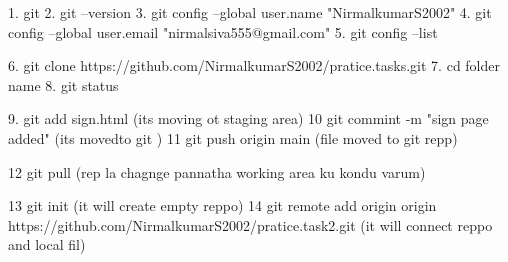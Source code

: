 1. git
2. git --version
3. git config --global user.name "NirmalkumarS2002"
4. git config --global user.email "nirmalsiva555@gmail.com"
5. git config --list 

6. git clone https://github.com/NirmalkumarS2002/pratice.tasks.git
7. cd folder name
8. git status

9. git add sign.html (its moving ot staging area)
10 git commint -m "sign page added" (its movedto git )
11 git push origin main (file moved to git repp)

12 git pull (rep la chagnge pannatha working area ku kondu varum)

13 git init (it will create empty reppo)
14 git remote add origin  origin https://github.com/NirmalkumarS2002/pratice.task2.git  (it will connect reppo and local fil)